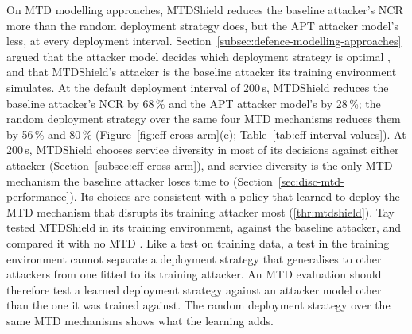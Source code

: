 \documentclass{cshonours}
\begin{document}
On MTD modelling approaches, MTDShield reduces the baseline attacker's NCR
more than the random deployment strategy does, but the APT attacker model's
less, at every deployment interval. Section~\ref{subsec:defence-modelling-approaches}
argued that the attacker model decides which deployment strategy is optimal
\citep{cho2020}, and that MTDShield's attacker is the baseline attacker its
training environment simulates. At the default deployment interval of
200\,s, MTDShield reduces the baseline attacker's NCR by 68\,\% and the APT
attacker model's by 28\,\%; the random deployment strategy over the same four MTD
mechanisms reduces them by 56\,\% and 80\,\% (Figure~\ref{fig:eff-cross-arm}(e); Table~\ref{tab:eff-interval-values}). At 200\,s, MTDShield
chooses service diversity in most of its decisions against either attacker
(Section~\ref{subsec:eff-cross-arm}), and service diversity is the only MTD
mechanism the baseline attacker loses time to
(Section~\ref{sec:disc-mtd-performance}). Its
choices are consistent with a policy that learned to deploy the MTD mechanism
that disrupts its training attacker most (\ref{thr:mtdshield}). Tay tested MTDShield in its training environment,
against the baseline attacker, and compared it with no MTD \citep{tay2024}.
Like a test on training data, a test in the training environment cannot
separate a deployment strategy that generalises to other attackers from one
fitted to its training attacker. An MTD evaluation should therefore test a learned
deployment strategy against an attacker model other than the one it was
trained against. The random deployment strategy over the same MTD
mechanisms shows what the learning adds.
\end{document}
